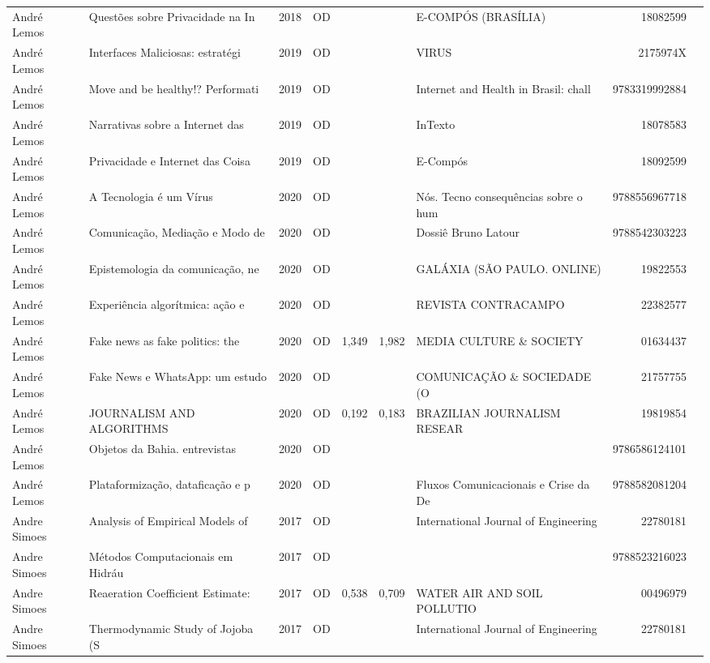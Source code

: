 \documentclass[12pt,brazil]{article}\usepackage[]{graphicx}\usepackage[]{xcolor}
\begin{document}
\begin{longtable}{lllrrllrr}
André Lemos & Questões sobre Privacidade na In & 2018 & OD &  &  & E-COMPÓS (BRASÍLIA) & 18082599 \\
André Lemos & Interfaces Maliciosas: estratégi & 2019 & OD &  &  & VIRUS & 2175974X \\
André Lemos & Move and be healthy!? Performati & 2019 & OD &  &  & Internet and Health in Brasil: chall & 9783319992884 \\
André Lemos & Narrativas sobre a Internet das  & 2019 & OD &  &  & InTexto & 18078583 \\
André Lemos & Privacidade e Internet das Coisa & 2019 & OD &  &  & E-Compós & 18092599 \\
André Lemos & A Tecnologia é um Vírus & 2020 & OD &  &  & Nós. Tecno consequências sobre o hum & 9788556967718 \\
André Lemos & Comunicação, Mediação e Modo de  & 2020 & OD &  &  & Dossiê Bruno Latour & 9788542303223 \\
André Lemos & Epistemologia da comunicação, ne & 2020 & OD &  &  & GALÁXIA (SÃO PAULO. ONLINE) & 19822553 \\
André Lemos & Experiência algorítmica: ação e  & 2020 & OD &  &  & REVISTA CONTRACAMPO & 22382577 \\
André Lemos & Fake news as fake politics: the  & 2020 & OD & 1,349 & 1,982 & MEDIA CULTURE \& SOCIETY & 01634437 \\
André Lemos & Fake News e WhatsApp: um estudo  & 2020 & OD &  &  & COMUNICAÇÃO \& SOCIEDADE (O & 21757755 \\
André Lemos & JOURNALISM AND ALGORITHMS & 2020 & OD & 0,192 & 0,183 & BRAZILIAN JOURNALISM RESEAR & 19819854 \\
André Lemos & Objetos da Bahia. entrevistas & 2020 & OD &  &  &  & 9786586124101 \\
André Lemos & Plataformização, dataficação e p & 2020 & OD &  &  & Fluxos Comunicacionais e Crise da De & 9788582081204 \\
Andre Simoes & Analysis of Empirical Models of  & 2017 & OD &  &  & International Journal of Engineering & 22780181 \\
Andre Simoes & Métodos Computacionais em Hidráu & 2017 & OD &  &  &  & 9788523216023 \\
Andre Simoes & Reaeration Coefficient Estimate: & 2017 & OD & 0,538 & 0,709 & WATER AIR AND SOIL POLLUTIO & 00496979 \\
Andre Simoes & Thermodynamic Study of Jojoba (S & 2017 & OD &  &  & International Journal of Engineering & 22780181 \\

\end{longtable}
\end{document}
